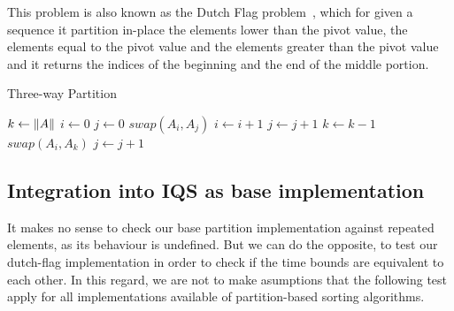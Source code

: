 This problem is also known as the Dutch Flag problem~\cite{10.5555/550359}, which for given a sequence it partition in-place the elements lower than the pivot value, the elements equal to the pivot value and the elements greater than the pivot value and it returns the indices of the beginning and the end of the middle portion.

\begin{algorithm}
\caption{Three-way Partition}\label{ALG:DUTCH_FLAG_PARTITION}
\begin{algorithmic}[1]
    \State $k \gets \lVert A\rVert$
    \State $i \gets 0$
    \State $j \gets 0$
            \State $swap(A_i, A_j)$
            \State $i \gets i+1$
            \State $j \gets j+1$
            \State $k \gets k-1$
            \State $swap(A_i, A_k)$
        \Else
            \State $j \gets j+1$
        \EndIf
    \EndWhile
    \EndProcedure
\end{algorithmic}
\end{algorithm}

\subsection{Integration into IQS as base implementation}

It makes no sense to check our base partition implementation against repeated elements, as its behaviour is undefined. But we can do the opposite, to test our dutch-flag implementation in order to check if the time bounds are equivalent to each other. In this regard, we are not to make asumptions that the following test apply for all implementations available of partition-based sorting algorithms.

